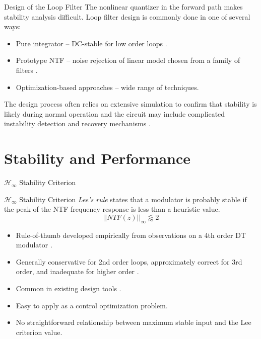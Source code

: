 \documentclass[10pt,usenames,dvipsnames]{beamer}
\begin{document}
\begin{frame}{Design of the Loop Filter}
	The nonlinear quantizer in the forward path makes stability analysis difficult.
	Loop filter design is commonly done in one of several ways: \pause
	\begin{itemize}
		\item Pure integrator -- DC-stable for low order loops \cite{Hein1993}. \pause
		\item Prototype NTF -- noise rejection of linear model chosen from a family of filters \cite[Appx. B]{Schreier1997}. \pause
		\item Optimization-based approaches -- wide range of techniques. \pause
	\end{itemize}
	The design process often relies on extensive simulation to confirm that stability is likely during normal operation and the circuit may include complicated instability detection and recovery mechanisms \cite{Wong2004, Sooch1989, Moussavi1994, Eynde1991}.
\end{frame}

\section{Stability and Performance}

\begin{frame}{$\mathcal{H}_\infty$ Stability Criterion}

\begin{block}{$\mathcal{H}_\infty$ Stability Criterion}
	\emph{Lee's rule} states that a modulator is probably stable if the peak of the NTF frequency response is less than a heuristic value.
	\begin{equation*}
		||NTF(z)||_\infty \lessapprox 2
	\end{equation*}
\end{block}
\pause
\begin{itemize}
	\item Rule-of-thumb developed empirically from observations on a 4th order DT modulator \cite{Chao1990}. \pause
	\item Generally conservative for 2nd order loops, approximately correct for 3rd order, and inadequate for higher order \cite{Schreier1993}. \pause
	\item Common in existing design tools \cite[Appx. B]{Schreier1997}. \pause
	\item Easy to apply as a control optimization problem.\pause
	\item No straightforward relationship between maximum stable input and the Lee criterion value.
\end{itemize}

\end{frame}
\end{document}
